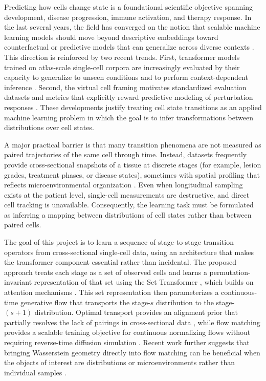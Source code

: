 \documentclass[conference]{IEEEtran}
\begin{document}
Predicting how cells change state is a foundational scientific objective spanning development, disease progression, immune activation, and therapy response. In the last several years, the field has converged on the notion that scalable machine learning models should move beyond descriptive embeddings toward counterfactual or predictive models that can generalize across diverse contexts \cite{Szalata2024-jl}. This direction is reinforced by two recent trends. First, transformer models trained on atlas-scale single-cell corpora are increasingly evaluated by their capacity to generalize to unseen conditions and to perform context-dependent inference \cite{Adduri2025-nt,Dong2026-fb}. Second, the virtual cell framing motivates standardized evaluation datasets and metrics that explicitly reward predictive modeling of perturbation responses \cite{Roohani2025-yb}. These developments justify treating cell state transitions as an applied machine learning problem in which the goal is to infer transformations between distributions over cell states.

A major practical barrier is that many transition phenomena are not measured as paired trajectories of the same cell through time. Instead, datasets frequently provide cross-sectional snapshots of a tissue at discrete stages (for example, lesion grades, treatment phases, or disease states), sometimes with spatial profiling that reflects microenvironmental organization \cite{Peng2025-xu}. Even when longitudinal sampling exists at the patient level, single-cell measurements are destructive, and direct cell tracking is unavailable. Consequently, the learning task must be formulated as inferring a mapping between distributions of cell states rather than between paired cells.

The goal of this project is to learn a sequence of stage-to-stage transition operators from cross-sectional single-cell data, using an architecture that makes the transformer component essential rather than incidental. The proposed approach treats each stage as a set of observed cells and learns a permutation-invariant representation of that set using the Set Transformer \cite{Lee2018-ya}, which builds on attention mechanisms \cite{Vaswani2017-rb}. This set representation then parameterizes a continuous-time generative flow that transports the stage-$s$ distribution to the stage-$(s+1)$ distribution. Optimal transport provides an alignment prior that partially resolves the lack of pairings in cross-sectional data \cite{Bunne2024-pl,Bunne2023-bm}, while flow matching provides a scalable training objective for continuous normalizing flows without requiring reverse-time diffusion simulation \cite{Lipman2022-ns}. Recent work further suggests that bringing Wasserstein geometry directly into flow matching can be beneficial when the objects of interest are distributions or microenvironments rather than individual samples \cite{Haviv2024-qe,Haviv2025-kd}.
\end{document}
